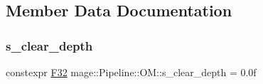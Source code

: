 \subsection{Member Data Documentation}
\hypertarget{structmage_1_1_pipeline_1_1_o_m_a24388e030eff7d28a3b1fb59f3cf57d5}{}\label{structmage_1_1_pipeline_1_1_o_m_a24388e030eff7d28a3b1fb59f3cf57d5} 
\subsubsection{\texorpdfstring{s\+\_\+clear\+\_\+depth}{s\_clear\_depth}}
{\footnotesize\ttfamily constexpr \hyperlink{namespacemage_aa97e833b45f06d60a0a9c4fc22ae02c0}{F32} mage\+::\+Pipeline\+::\+O\+M\+::s\+\_\+clear\+\_\+depth = 0.\+0f\hspace{0.3cm}{\ttfamily [static]}}


